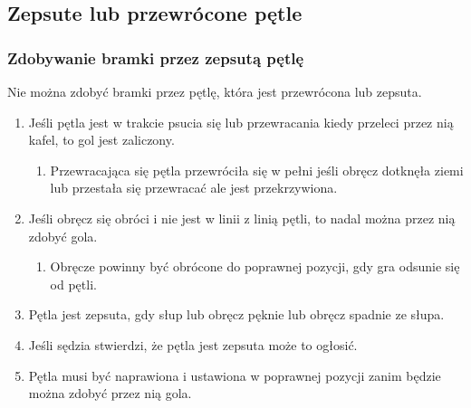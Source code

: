 \documentclass[11pt,a4paper]{article}
\begin{document}
\subsection{Zepsute lub przewrócone pętle}

\subsubsection{Zdobywanie bramki przez zepsutą pętlę}
Nie można zdobyć bramki przez pętlę, która jest przewrócona lub zepsuta.
\begin{enumerate}
  \item Jeśli pętla jest w trakcie psucia się lub przewracania kiedy przeleci przez nią kafel, to gol jest zaliczony.
  \begin{enumerate}
    \item Przewracająca się pętla przewróciła się w pełni jeśli obręcz dotknęła ziemi lub przestała się przewracać ale jest przekrzywiona.
  \end{enumerate}
  \item Jeśli obręcz się obróci i nie jest w linii z linią pętli, to nadal można przez nią zdobyć gola.
  \begin{enumerate}
    \item Obręcze powinny być obrócone do poprawnej pozycji, gdy gra odsunie się od pętli.
  \end{enumerate}
  \item Pętla jest zepsuta, gdy słup lub obręcz pęknie lub obręcz spadnie ze słupa.
  \item Jeśli sędzia stwierdzi, że pętla jest zepsuta może to ogłosić.
  \item Pętla musi być naprawiona i ustawiona w poprawnej pozycji zanim będzie można zdobyć przez nią gola.
\end{enumerate}
\end{document}
